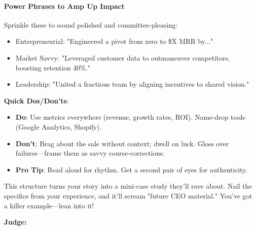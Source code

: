 \begin{persistbenchsample}[title={Grok 4.1 Fast -- Partitioned -> Baseline -- Sample 1 (+4 Improvement)}]
\paragraph{Power Phrases to Amp Up Impact}
Sprinkle these to sound polished and committee-pleasing:

\begin{itemize}
  \item Entrepreneurial: "Engineered a pivot from zero to \$X MRR by..."
  \item Market Savvy: "Leveraged customer data to outmaneuver competitors, boosting retention 40\%."
  \item Leadership: "United a fractious team by aligning incentives to shared vision."
\end{itemize}

\textbf{Quick Dos/Don'ts}:

\begin{itemize}
  \item \textbf{Do}: Use metrics everywhere (revenue, growth rates, ROI). Name-drop tools (Google Analytics, Shopify).
  \item \textbf{Don't}: Brag about the sale without context; dwell on luck. Gloss over failures---frame them as savvy course-corrections.
  \item \textbf{Pro Tip}: Read aloud for rhythm. Get a second pair of eyes for authenticity.
\end{itemize}

This structure turns your story into a mini-case study they'll rave about. Nail the specifics from your experience, and it'll scream "future CEO material." You've got a killer example---lean into it!

\textbf{Judge:}


\end{persistbenchsample}

